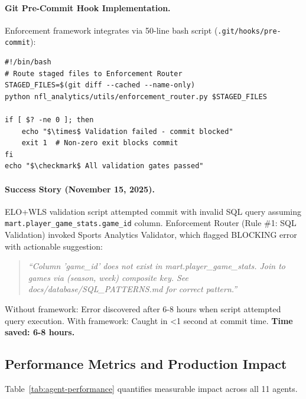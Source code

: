 \paragraph{Git Pre-Commit Hook Implementation.}
Enforcement framework integrates via 50-line bash script (\texttt{.git/hooks/pre-commit}):

\begin{verbatim}
#!/bin/bash
# Route staged files to Enforcement Router
STAGED_FILES=$(git diff --cached --name-only)
python nfl_analytics/utils/enforcement_router.py $STAGED_FILES

if [ $? -ne 0 ]; then
    echo "$\times$ Validation failed - commit blocked"
    exit 1  # Non-zero exit blocks commit
fi
echo "$\checkmark$ All validation gates passed"
\end{verbatim}

\paragraph{Success Story (November 15, 2025).}
ELO+WLS validation script attempted commit with invalid SQL query assuming \texttt{mart.player\_game\_stats.game\_id} column. Enforcement Router (Rule \#1: SQL Validation) invoked Sports Analytics Validator, which flagged BLOCKING error with actionable suggestion:

\begin{quote}
\textit{``Column 'game\_id' does not exist in mart.player\_game\_stats. Join to games via (season, week) composite key. See docs/database/SQL\_PATTERNS.md for correct pattern.''}
\end{quote}

Without framework: Error discovered after 6-8 hours when script attempted query execution. With framework: Caught in <1 second at commit time. \textbf{Time saved: 6-8 hours.}

\subsection{Performance Metrics and Production Impact}

Table~\ref{tab:agent-performance} quantifies measurable impact across all 11 agents.

